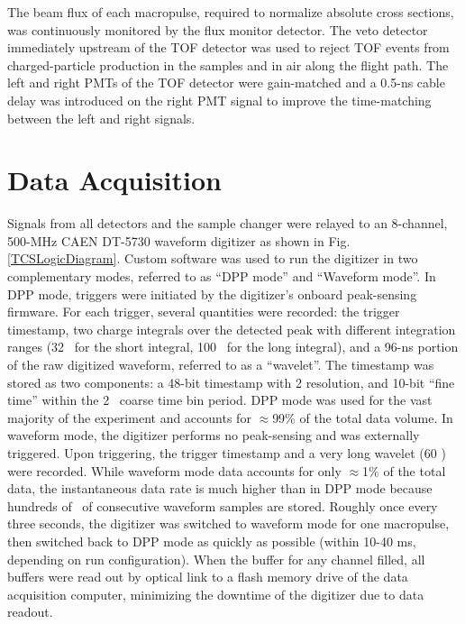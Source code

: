 The beam flux of each macropulse, required to normalize absolute cross sections, was continuously
monitored by the flux monitor detector. The veto detector immediately upstream
of the TOF detector was used to reject TOF events from
charged-particle production in the samples and in air along the flight path. The
left and right PMTs of the TOF detector were gain-matched and a
0.5-ns cable delay was introduced on the right PMT signal to improve the
time-matching between the left and right signals.

\section{Data Acquisition} \label{DataAcquisition}
Signals from all detectors and the sample changer were relayed to an 8-channel, 500-MHz CAEN 
DT-5730
waveform digitizer as shown in Fig. \ref{TCSLogicDiagram}. Custom software was used to run the 
digitizer in two complementary modes, referred to as ``DPP mode'' and ``Waveform 
mode''. In DPP mode, triggers were initiated by the digitizer's onboard
peak-sensing firmware. For each trigger, several quantities were recorded: the trigger 
timestamp, two charge integrals over the detected peak with different
integration ranges (32 \nano\second\ for the short integral, 100 \nano\second\ for
the long integral),
and a 96-ns portion of the raw digitized waveform, referred to as a ``wavelet''.
The timestamp was stored as two components: a 48-bit timestamp with 2 \nano\second resolution,
and 10-bit ``fine time'' within the 2 \nano\second\ coarse time bin period.
DPP mode was used for the vast majority of the 
experiment and accounts for $\approx$99\% of the total data volume. In waveform mode, 
the digitizer performs no peak-sensing and was externally triggered. Upon 
triggering, the trigger timestamp and a very long wavelet (60 \micro\second) 
were recorded. While waveform mode data accounts for only $\approx$1\% of the total data, 
the instantaneous data rate is much higher than in DPP 
mode because hundreds of \micro\second\ of consecutive waveform samples are 
stored. Roughly once every three seconds, the digitizer was switched to 
waveform mode for one macropulse, then switched back to DPP mode as quickly as
possible (within 10-40 ms, depending on run configuration). When the buffer for
any channel filled, all buffers were read out by optical link to a flash memory
drive of the data acquisition computer, minimizing the downtime of the digitizer
due to data readout.

